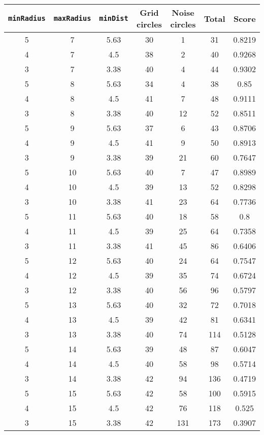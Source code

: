 \documentclass[letterpaper, 12pt]{article}
\begin{document}
\begin{longtable}{|c|c|c|c|c|c|c|}
\hline
\textbf{\texttt{minRadius}} & \textbf{\texttt{maxRadius}} & \textbf{\texttt{minDist}} & \textbf{Grid circles} & \textbf{Noise circles} & \textbf{Total} & \textbf{Score} \\
\hline
5 & 7 & 5.63 & 30 & 1 & 31 & 0.8219 \\
\hline
4 & 7 & 4.5 & 38 & 2 & 40 & 0.9268 \\
\hline
3 & 7 & 3.38 & 40 & 4 & 44 & 0.9302 \\
\hline
5 & 8 & 5.63 & 34 & 4 & 38 & 0.85 \\
\hline
4 & 8 & 4.5 & 41 & 7 & 48 & 0.9111 \\
\hline
3 & 8 & 3.38 & 40 & 12 & 52 & 0.8511 \\
\hline
5 & 9 & 5.63 & 37 & 6 & 43 & 0.8706 \\
\hline
4 & 9 & 4.5 & 41 & 9 & 50 & 0.8913 \\
\hline
3 & 9 & 3.38 & 39 & 21 & 60 & 0.7647 \\
\hline
5 & 10 & 5.63 & 40 & 7 & 47 & 0.8989 \\
\hline
4 & 10 & 4.5 & 39 & 13 & 52 & 0.8298 \\
\hline
3 & 10 & 3.38 & 41 & 23 & 64 & 0.7736 \\
\hline
5 & 11 & 5.63 & 40 & 18 & 58 & 0.8 \\
\hline
4 & 11 & 4.5 & 39 & 25 & 64 & 0.7358 \\
\hline
3 & 11 & 3.38 & 41 & 45 & 86 & 0.6406 \\
\hline
5 & 12 & 5.63 & 40 & 24 & 64 & 0.7547 \\
\hline
4 & 12 & 4.5 & 39 & 35 & 74 & 0.6724 \\
\hline
3 & 12 & 3.38 & 40 & 56 & 96 & 0.5797 \\
\hline
5 & 13 & 5.63 & 40 & 32 & 72 & 0.7018 \\
\hline
4 & 13 & 4.5 & 39 & 42 & 81 & 0.6341 \\
\hline
3 & 13 & 3.38 & 40 & 74 & 114 & 0.5128 \\
\hline
5 & 14 & 5.63 & 39 & 48 & 87 & 0.6047 \\
\hline
4 & 14 & 4.5 & 40 & 58 & 98 & 0.5714 \\
\hline
3 & 14 & 3.38 & 42 & 94 & 136 & 0.4719 \\
\hline
5 & 15 & 5.63 & 42 & 58 & 100 & 0.5915 \\
\hline
4 & 15 & 4.5 & 42 & 76 & 118 & 0.525 \\
\hline
3 & 15 & 3.38 & 42 & 131 & 173 & 0.3907 \\

\end{longtable}
\end{document}
